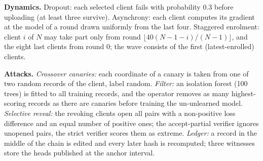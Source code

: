 \documentclass[journal]{IEEEtran}
\begin{document}
\textbf{Dynamics.} Dropout: each selected client fails with probability 0.3 before uploading (at least three survive). Asynchrony: each client computes its gradient at the model of a round drawn uniformly from the last four. Staggered enrolment: client $i$ of $N$ may take part only from round $\lfloor 40(N-1-i)/(N-1)\rfloor$, and the eight last clients from round 0; the wave consists of the first (latest-enrolled) clients.

\textbf{Attacks.} \emph{Crossover canaries:} each coordinate of a canary is taken from one of two random records of the client, label random. \emph{Filter:} an isolation forest (100 trees) is fitted to all training records, and the operator removes as many highest-scoring records as there are canaries before training the un-unlearned model. \emph{Selective reveal:} the revoking clients open all pairs with a non-positive loss difference and an equal number of positive ones; the accept-partial verifier ignores unopened pairs, the strict verifier scores them as extreme. \emph{Ledger:} a record in the middle of the chain is edited and every later hash is recomputed; three witnesses store the heads published at the anchor interval.
\end{document}
